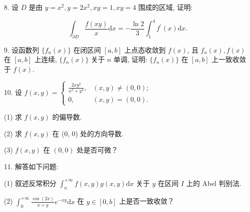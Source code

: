 \documentclass{examcollection}
\renewcommand{\displayformula}[1]{\[#1\]}
\begin{document}
{\begin{minipage}{\textwidth}
8. 设 $D$ 是由 $y = x^{2}, y = 2x^{2}, xy = 1, xy = 4$ 围成的区域, 证明:\par
\displayformula{\int_ {\partial D} \frac {f (x y)}{x} \mathrm{d} x = - \frac {\ln 2}{3} \int_ {1} ^ {4} f ^ {\prime} (x) \mathrm{d} x.}\par
9. 设函数列 $\{f_n(x)\}$ 在闭区间 $[a, b]$ 上点态收敛到 $f(x)$, 且 $f_n(x), f(x)$ 在 $[a, b]$ 上连续, $\{f_n(x)\}$ 关于 $n$ 单调, 证明: $\{f_n(x)\}$ 在 $[a, b]$ 上一致收敛于 $f(x)$.\par
10. 设 $f(x, y) = \begin{cases} \frac{2xy^2}{x^2 + y^4}, & (x, y) \neq (0, 0); \\ 0, & (x, y) = (0, 0). \end{cases}$\par
(1) 求 $f(x, y)$ 的偏导数.\par
(2) 求 $f(x, y)$ 在 (0, 0) 处的方向导数.\par
(3) $f(x,y)$ 在 $(0,0)$ 处是否可微？\par
11. 解答如下问题:\par
(1) 叙述反常积分 $\int_{a}^{+\infty} f(x, y) g(x, y) \mathrm{d}x$ 关于 $y$ 在区间 $I$ 上的 Abel 判别法.\par
(2) $\int_0^{+\infty}\frac{\cos(2x)}{x + y} e^{-xy}\mathrm{d}x$ 在 $y\in [0,b]$ 上是否一致收敛？\par
\end{minipage}}
\ifdim\dimexpr\ht\proofbox+\dp\proofbox\relax>\textheight
\noindent\resizebox{!}{\textheight}{\usebox{\proofbox}}\else\noindent\usebox{\proofbox}\fi\clearpage
\end{document}
